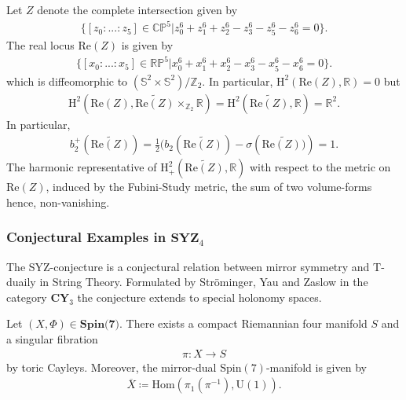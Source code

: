 \documentclass[psamsfonts]{amsart}
\theoremstyle{plain}
\theoremstyle{definition}{
\newtheorem{defi}{Definition}[section]
\newtheorem{ass}{Assumption}
\newtheorem*{nota}{Notation}}
\theoremstyle{remark}{
\newtheorem{rem}{Remark}
\newtheorem{ex}{Example}}
\theoremstyle{plain}{
\newtheorem{thm}{Theorem}[section]
\newtheorem{lem}{Lemma}[section]
\newtheorem{cor}{Corollary}[section]
\newtheorem{prop}{Proposition}[section]
\newtheorem{con}{Conjecture}[section]}
\newcommand{\m}[1]{{\mathrm{#1}}}
\newcommand{\cat}[1]{\textbf{#1}}
\begin{document}
\begin{ex}
    Let $Z$ denote the complete intersection given by 
    \begin{align*}
        \{[z_0:...:z_5]\in\mathbb{CP}^5|z_0^6+z_1^6+z_2^6-z_3^6-z_5^6-z_6^6=0\}.
    \end{align*}
    The real locus $\m{Re}(Z)$ is given by 
        \begin{align*}
        \{[x_0:...:x_5]\in\mathbb{RP}^5|x_0^6+x_1^6+x_2^6-x_3^6-x_5^6-x_6^6=0\}.
    \end{align*}
    which is diffeomorphic to $(\mathbb{S}^2\times \mathbb{S}^2)/\mathbb{Z}_2$. In particular, $\m{H}^2(\m{Re}(Z),\mathbb{R})=0$ but
    \begin{align*}
        \m{H}^2(\m{Re}(Z),\widetilde{\m{Re}(Z)}\times_{\mathbb{Z}_2}\mathbb{R})=\m{H}^2(\widetilde{\m{Re}(Z)},\mathbb{R})=\mathbb{R}^2.
    \end{align*}
    In particular, 
    \begin{align*}
        b_2^+(\widetilde{\m{Re}(Z)})=\frac{1}{2}(b_2(\widetilde{\m{Re}(Z)})-\sigma(\widetilde{\m{Re}(Z))})=1.
    \end{align*}
    The harmonic representative of $\m{H}^2_+(\widetilde{\m{Re}(Z)},\mathbb{R})$ with respect to the metric on $\m{Re}(Z)$, induced by the Fubini-Study metric, the sum of two volume-forms hence, non-vanishing. 
\end{ex}





\subsubsection{Conjectural Examples in $\cat{SYZ}_4$}
\label{Conjectural Examples in SYZ4}

The SYZ-conjecture is a conjectural relation between mirror symmetry and T-duaily in String Theory. Formulated by Ströminger, Yau and Zaslow in the category $\cat{CY}_3$ the conjecture extends to special holonomy spaces.

\begin{con}\cite{SYZ}
    Let $(X,\Phi)\in \cat{Spin(7)}$. There exists a compact Riemannian four manifold $S$ and a singular fibration 
    \begin{align*}
        \pi\colon X\rightarrow S
    \end{align*}
    by toric Cayleys. Moreover, the mirror-dual $\m{Spin}(7)$-manifold is given by 
    \begin{align*}
        \overline{X}\coloneqq\m{Hom}(\pi_1(\pi^{-1}),\m{U}(1)).
    \end{align*}
\end{con}
\end{document}

